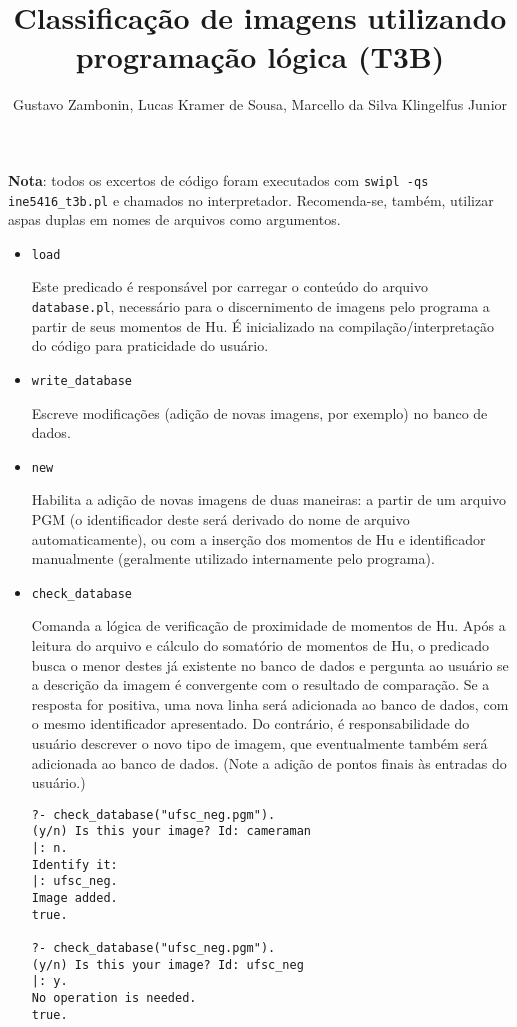 \documentclass{../sftex/sftex}
\title{Classificação de imagens utilizando programação lógica (T3B)}
\author{Gustavo Zambonin, Lucas Kramer de Sousa,
    Marcello da Silva Klingelfus Junior}
\begin{document}
\maketitle

\textbf{Nota}: todos os excertos de código foram executados com
\verb!swipl -qs ine5416_t3b.pl! e chamados no interpretador. Recomenda-se,
também, utilizar aspas duplas em nomes de arquivos como argumentos.

\begin{itemize}

\item \verb!load!

Este predicado é responsável por carregar o conteúdo do arquivo
\verb!database.pl!, necessário para o discernimento de imagens pelo programa
a partir de seus momentos de Hu. É inicializado na compilação/interpretação do
código para praticidade do usuário.

\item \verb!write_database!

Escreve modificações (adição de novas imagens, por exemplo) no banco de dados.

\item \verb!new!

Habilita a adição de novas imagens de duas maneiras: a partir de um arquivo PGM
(o identificador deste será derivado do nome de arquivo automaticamente), ou
com a inserção dos momentos de Hu e identificador manualmente (geralmente
utilizado internamente pelo programa).

\item \verb!check_database!

Comanda a lógica de verificação de proximidade de momentos de Hu. Após a leitura
do arquivo e cálculo do somatório de momentos de Hu, o predicado busca o menor
destes já existente no banco de dados e pergunta ao usuário se a descrição da
imagem é convergente com o resultado de comparação. Se a resposta for positiva,
uma nova linha será adicionada ao banco de dados, com o mesmo identificador
apresentado. Do contrário, é responsabilidade do usuário descrever o novo tipo
de imagem, que eventualmente também será adicionada ao banco de dados. (Note a
adição de pontos finais às entradas do usuário.)
\begin{verbatim}
?- check_database("ufsc_neg.pgm").
(y/n) Is this your image? Id: cameraman
|: n.
Identify it:
|: ufsc_neg.
Image added.
true.

?- check_database("ufsc_neg.pgm").
(y/n) Is this your image? Id: ufsc_neg
|: y.
No operation is needed.
true.
\end{verbatim}


\end{itemize}
\end{document}
